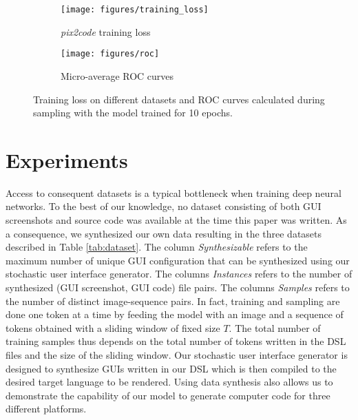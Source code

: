 \documentclass{article}
\begin{document}
\begin{figure}[H]
    \begin{subfigure}{.5\textwidth}
        \centering
        \texttt{[image: figures/training\_loss]}
        \caption{\emph{pix2code} training loss}
    \end{subfigure}
    \begin{subfigure}{.5\textwidth}
        \centering
        \texttt{[image: figures/roc]}
        \caption{Micro-average ROC curves}
    \end{subfigure}
    \caption{Training loss on different datasets and ROC curves calculated during sampling with the model trained for 10 epochs.}
    \label{fig:training_stats}
\end{figure}

\section{Experiments}

Access to consequent datasets is a typical bottleneck when training deep neural networks. To the best of our knowledge, no dataset consisting of both GUI screenshots and source code was available at the time this paper was written. As a consequence, we synthesized our own data resulting in the three datasets described in Table \ref{tab:dataset}. The column \emph{Synthesizable} refers to the maximum number of unique GUI configuration that can be synthesized using our stochastic user interface generator. The columns \emph{Instances} refers to the number of synthesized (GUI screenshot, GUI code) file pairs. The columns \emph{Samples} refers to the number of distinct image-sequence pairs. In fact, training and sampling are done one token at a time by feeding the model with an image and a sequence of tokens obtained with a sliding window of fixed size $T$. The total number of training samples thus depends on the total number of tokens written in the DSL files and the size of the sliding window. Our stochastic user interface generator is designed to synthesize GUIs written in our DSL which is then compiled to the desired target language to be rendered. Using data synthesis also allows us to demonstrate the capability of our model to generate computer code for three different platforms.
\end{document}

